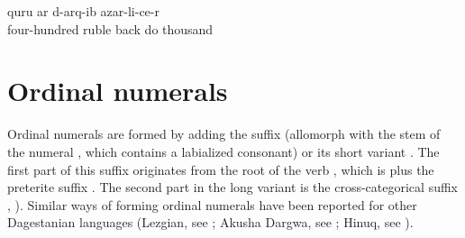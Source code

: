 \ea\label{ex:fromthe1000rubles}
 q\lmk uru{\pafr} \paaf ar d-arq\ej-ib azar-li-c\lmk e-r\\
	four-hundred ruble back do thousand\\
\glt	{}
\z




\section{Ordinal numerals}
\label{sec:ordinalnumerals}

Ordinal numerals are formed by adding the suffix  (allomorph  with the stem of the numeral , which contains a labialized consonant) or its short variant . The first part of this suffix originates from the root of the verb , which is \tit{-\glpl-} plus the preterite suffix . The second part  in the long variant is the cross-categorical suffix , ). Similar ways of forming ordinal numerals have been reported for other Dagestanian languages (\teg Lezgian, see \citealp[233]{Haspelmath1993}; Akusha Dargwa, see \citealp[30 fn.10]{vandenBerg2001}; Hinuq, see \citealp[401]{Forker2013a}).


